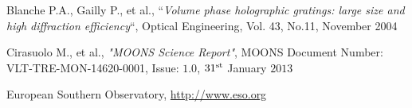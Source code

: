 \documentclass[Lau, oneside]{sapthesis}%
\begin{document}
\backmatter
{}
\begin{thebibliography}{17}

Blanche P.A., Gailly P., et al., “\textit{Volume phase holographic gratings: large size and high diffraction efficiency}“, Optical Engineering, Vol. 43, No.11, November 2004

Cirasuolo M., et al., \textit{"MOONS Science Report"}, MOONS Document Number: VLT-TRE-MON-14620-0001, Issue: $1.0$, $31^{\textup{st}}$ January $2013$

European Southern Observatory, \url{http://www.eso.org}

\end{thebibliography}
\end{document}
